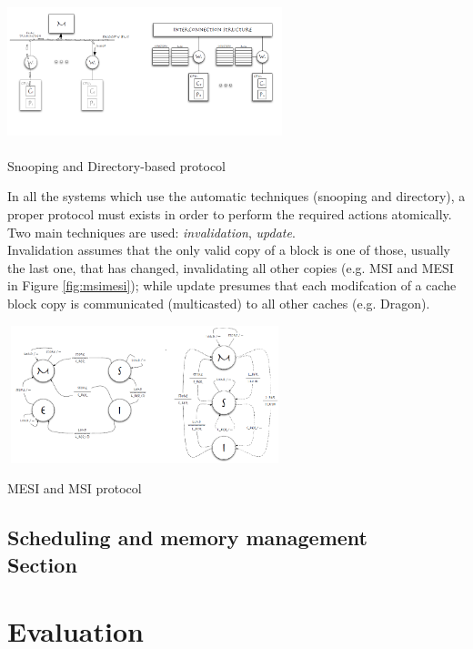 \documentclass[a4paper,10pt]{article}
\makeatletter
\newenvironment{figurehere}{\def\@captype{figure}\vspace{2ex}}{\vspace{2ex}}
\makeatother
\begin{document}
\begin{multicols}{2}
\begin{figurehere}
 \centering
 \includegraphics[width=8cm, height=4cm]{./eps/SnoopeDir.png}
 \caption{Snooping and Directory-based protocol}
 \label{fig:s&d}
\end{figurehere}

In all the systems which use the automatic techniques (snooping and directory), a proper protocol must exists in order to perform the required actions atomically. Two main techniques are used: \emph{invalidation}, \emph{update}.\\
Invalidation assumes that the only valid copy of a block is one of those, usually the last one, that has changed, invalidating all other copies (e.g. MSI and MESI in Figure \ref{fig:msimesi}); while update presumes that each modifcation of a cache block copy is communicated (multicasted) to all other caches (e.g. Dragon).

\begin{figurehere}
 \centering
 \includegraphics[width=8cm, height=4cm]{./eps/msimesi.png}
 \caption{MESI and MSI protocol}
 \label{fig:msimesi}
\end{figurehere}

\subsection{Scheduling and memory management \\ Section}



\section{Evaluation}


\end{multicols}
\end{document}
